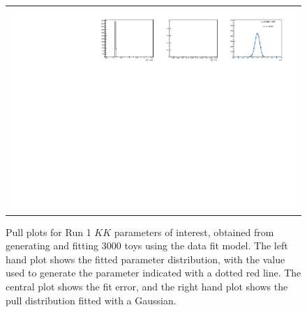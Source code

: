 \begin{figure}
\begin{tabular}{c}
\includegraphics[width=\textwidth]{ANA_resources/Plots/Data_fit/FitterBias//R_ds_KK_run1.pdf} \\
  \end{tabular}
  \caption{Pull plots for Run 1 $KK$ parameters of interest, obtained from generating and fitting 3000 toys using the data fit model. The left hand plot shows the fitted parameter distribution, with the value used to generate the parameter indicated with a dotted red line. The central plot shows the fit error, and the right hand plot shows the pull distribution fitted with a Gaussian.}
\label{fig:KK_run1_pulls}
\end{figure}
